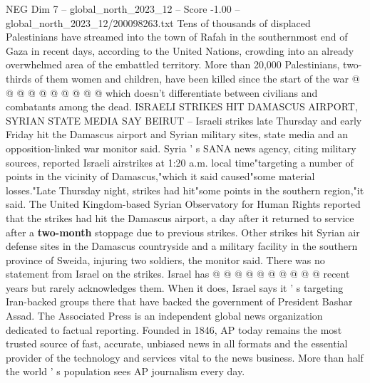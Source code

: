 \begin{textsample}{NEG Dim 7 – global\_north\_2023\_12 – Score -1.00 – global\_north\_2023\_12/200098263.txt}
Tens of thousands of displaced Palestinians have streamed into the town of Rafah in the southernmost end of Gaza in recent days, according to the United Nations, crowding into an already overwhelmed area of the embattled territory.
More than 20,000 Palestinians, two-thirds of them women and children, have been killed since the start of the war @ @ @ @ @ @ @ @ @ @ which doesn't differentiate between civilians and combatants among the dead.
ISRAELI STRIKES HIT DAMASCUS AIRPORT, SYRIAN STATE MEDIA SAY BEIRUT -- Israeli strikes late Thursday and early Friday hit the Damascus airport and Syrian military sites, state media and an opposition-linked war monitor said.
Syria ' s SANA news agency, citing military sources, reported Israeli airstrikes at 1:20 a.m. local time"targeting a number of points in the vicinity of Damascus,"which it said caused"some material losses."Late Thursday night, strikes had hit"some points in the southern region,"it said.
The United Kingdom-based Syrian Observatory for Human Rights reported that the strikes had hit the Damascus airport, a day after it returned to service after a \textbf{two-month} stoppage due to previous strikes.
Other strikes hit Syrian air defense sites in the Damascus countryside and a military facility in the southern province of Sweida, injuring two soldiers, the monitor said.
There was no statement from Israel on the strikes.
Israel has @ @ @ @ @ @ @ @ @ @ recent years but rarely acknowledges them.
When it does, Israel says it ' s targeting Iran-backed groups there that have backed the government of President Bashar Assad.
The Associated Press is an independent global news organization dedicated to factual reporting.
Founded in 1846, AP today remains the most trusted source of fast, accurate, unbiased news in all formats and the essential provider of the technology and services vital to the news business.
More than half the world ' s population sees AP journalism every day.

\end{textsample}
